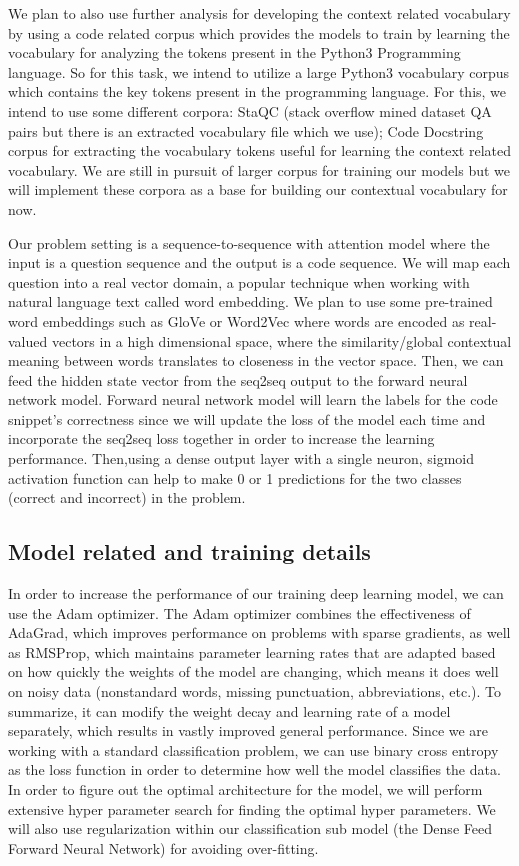 \documentclass[11pt,a4paper]{article}
\begin{document}
We plan to also use further analysis for developing the context
related vocabulary by using a code related corpus which provides the
models to train by learning the vocabulary for analyzing the tokens
present in the Python3 Programming language. So for this task, we
intend to utilize a large Python3 vocabulary corpus which contains the
key tokens present in the programming language. For this, we intend to
use some different corpora: StaQC (stack overflow mined dataset QA
pairs but there is an extracted vocabulary file which we use); Code
Docstring corpus for extracting the vocabulary tokens useful for
learning the context related vocabulary. We are still in pursuit of
larger corpus for training our models but we will implement these
corpora as a base for building our contextual vocabulary for now.

Our problem setting is a sequence-to-sequence with attention model
where the input is a question sequence and the output is a code
sequence. We will map each question into a real vector domain, a
popular technique when working with natural language text called word
embedding. We plan to use some pre-trained word embeddings such as
GloVe or Word2Vec where words are encoded as real-valued vectors in a
high dimensional space, where the similarity/global contextual meaning
between words translates to closeness in the vector space. Then, we
can feed the hidden state vector from the seq2seq output to the
forward neural network model.  Forward neural network model will learn
the labels for the code snippet’s correctness since we will update the
loss of the model each time and incorporate the seq2seq loss together
in order to increase the learning performance. Then,using a dense
output layer with a single neuron, sigmoid activation function can
help to make 0 or 1 predictions for the two classes (correct and
incorrect) in the problem. 

\subsection{Model related and training details}
In order to increase the performance of our training deep learning model, we can use the Adam optimizer. The Adam optimizer combines the effectiveness of AdaGrad, which improves performance on problems with sparse gradients, as well as RMSProp, which maintains parameter learning rates that are adapted based on how quickly the weights of the model are changing, which means it does well on noisy data (nonstandard words, missing punctuation, abbreviations, etc.). To summarize, it can modify the weight decay and learning rate of a model separately, which results in vastly improved general performance. Since we are working with a standard classification problem, we can use binary cross entropy as the loss function in order to determine how well the model classifies the data. In order to figure out the optimal architecture for the model, we will perform extensive hyper parameter search for finding the optimal hyper parameters. We will also use regularization within our classification sub model (the Dense Feed Forward Neural Network) for avoiding over-fitting.
\end{document}

